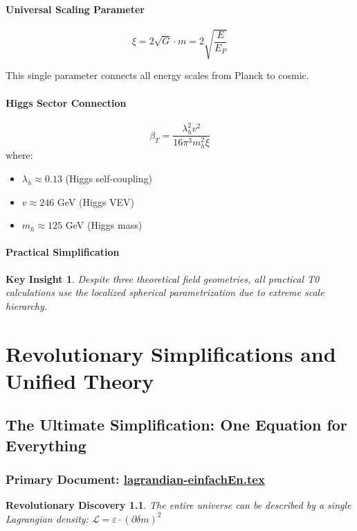 \documentclass[12pt,a4paper]{report}
\newtheorem{insight}{Key Insight}[chapter]
\newtheorem{discovery}{Revolutionary Discovery}[chapter]
\begin{document}
	\subsubsection{Universal Scaling Parameter}
	$$\xi = 2\sqrt{G} \cdot m = 2\sqrt{\frac{E}{E_P}}$$
	
	This single parameter connects all energy scales from Planck to cosmic.
	
	\subsubsection{Higgs Sector Connection}
	$$\beta_T = \frac{\lambda_h^2 v^2}{16\pi^3 m_h^2 \xi}$$
	where:
	\begin{itemize}
		\item $\lambda_h \approx 0.13$ (Higgs self-coupling)
		\item $v \approx 246$ GeV (Higgs VEV)
		\item $m_h \approx 125$ GeV (Higgs mass)
	\end{itemize}
	
	\subsubsection{Practical Simplification}
	\begin{insight}
		Despite three theoretical field geometries, all practical T0 calculations use the localized spherical parametrization due to extreme scale hierarchy.
	\end{insight}
	
	\chapter{Revolutionary Simplifications and Unified Theory}
	
	\section{The Ultimate Simplification: One Equation for Everything}
	\subsection{Primary Document: \href{https://github.com/jpascher/T0-Time-Mass-Duality/tree/main/2/pdf/lagrandian-einfachEn.pdf}{lagrandian-einfachEn.tex}}
	
	\begin{discovery}
		The entire universe can be described by a single Lagrangian density: $\mathcal{L} = \varepsilon \cdot (\partial \delta m)^2$
	\end{discovery}
	
\end{document}
